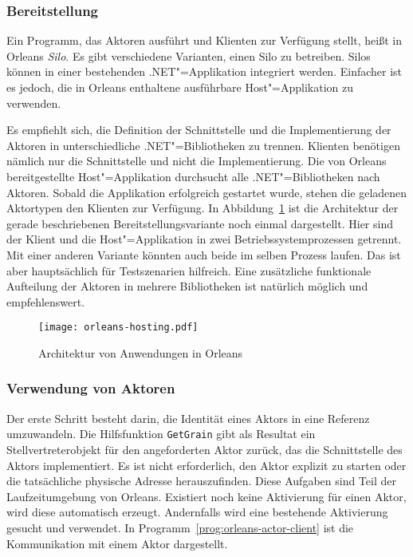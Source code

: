 \subsubsection{Bereitstellung}

Ein Programm, das Aktoren ausführt und Klienten zur Verfügung stellt, heißt in Orleans \textit{Silo}. Es gibt verschiedene Varianten, einen Silo zu betreiben. Silos können in einer bestehenden .NET"=Applikation integriert werden. Einfacher ist es jedoch, die in Orleans enthaltene ausführbare Host"=Applikation zu verwenden. 

Es empfiehlt sich, die Definition der Schnittstelle und die Implementierung der Aktoren in unterschiedliche .NET"=Bibliotheken zu trennen. Klienten benötigen nämlich nur die Schnittstelle und nicht die Implementierung. Die von Orleans bereitgestellte Host"=Applikation durchsucht alle .NET"=Bibliotheken nach Aktoren. Sobald die Applikation erfolgreich gestartet wurde, stehen die geladenen Aktortypen den Klienten zur Verfügung. In Abbildung~\ref{fig:orleans-arch} ist die Architektur der gerade beschriebenen Bereitstellungsvariante noch einmal dargestellt. Hier sind der Klient und die Host"=Applikation in zwei Betriebssystemprozessen getrennt. Mit einer anderen Variante könnten auch beide im selben Prozess laufen. Das ist aber hauptsächlich für Testszenarien hilfreich. Eine zusätzliche funktionale Aufteilung der Aktoren in mehrere Bibliotheken ist natürlich möglich und empfehlenswert. 

\begin{figure}[!hbt]%
\setlength{\belowcaptionskip}{-10pt}
\texttt{[image: orleans-hosting.pdf]}%
\caption{Architektur von Anwendungen in Orleans}%
\label{fig:orleans-arch}%
\end{figure}

\subsubsection{Verwendung von Aktoren}

Der erste Schritt besteht darin, die Identität eines Aktors in eine Referenz umzuwandeln. Die Hilfsfunktion \lstinline{GetGrain} gibt als Resultat ein Stellvertreterobjekt für den angeforderten Aktor zurück, das die Schnittstelle des Aktors implementiert. Es ist nicht erforderlich, den Aktor explizit zu starten oder die tatsächliche physische Adresse herauszufinden. Diese Aufgaben sind Teil der Laufzeitumgebung von Orleans. Existiert noch keine Aktivierung für einen Aktor, wird diese automatisch erzeugt. Andernfalls wird eine bestehende Aktivierung gesucht und verwendet. In Programm~\ref{prog:orleans-actor-client} ist die Kommunikation mit einem Aktor dargestellt.

